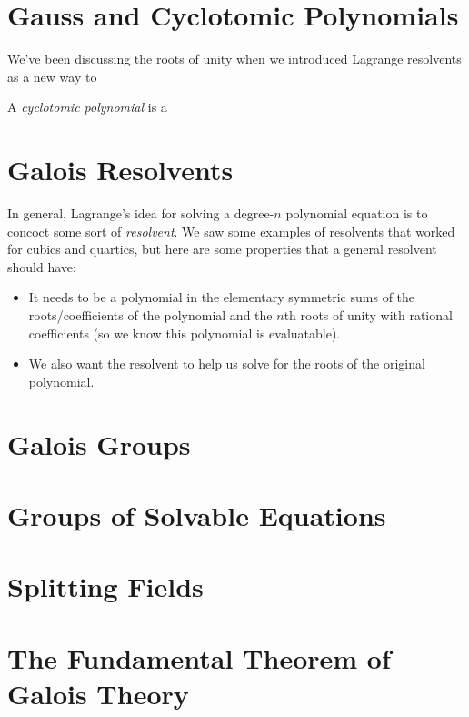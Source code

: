 \documentclass[12pt]{scrartcl}
\begin{document}
\section{Gauss and Cyclotomic Polynomials}
We've been discussing the roots of unity when we introduced Lagrange resolvents as a new way to

A \textit{cyclotomic polynomial} is a

\section{Galois Resolvents}
In general, Lagrange's idea for solving a degree-$n$ polynomial equation is to concoct some sort of \textit{resolvent}. We saw some examples of resolvents that worked for cubics and quartics, but here are some properties that a general resolvent should have: 
\begin{itemize}
    \item It needs to be a polynomial in the elementary symmetric sums of the roots/coefficients of the polynomial and the $n$th roots of unity with rational coefficients (so we know this polynomial is evaluatable).
    \item We also want the resolvent to help us solve for the roots of the original polynomial.
\end{itemize}  

\section{Galois Groups}

\section{Groups of Solvable Equations}

\section{Splitting Fields}

\section{The Fundamental Theorem of Galois Theory}
\end{document}
